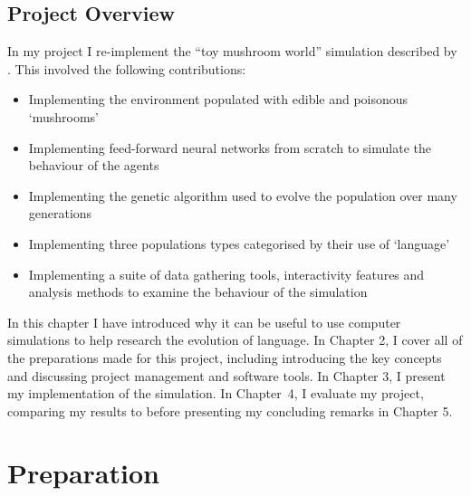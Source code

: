\documentclass[12pt,a4paper,twoside,openright]{report}
\begin{document}
\section{Project Overview}

\enlargethispage*{1cm}

In my project I re-implement the ``toy mushroom world'' simulation described by \citet{Cangelosi1998}. This involved the following contributions:
\begin{itemize}
	\itemsep0em
	\item Implementing the environment populated with edible and poisonous `mushrooms'
	\item Implementing feed-forward neural networks from scratch to simulate the behaviour of the agents
	\item Implementing the genetic algorithm used to evolve the population over many generations
	\item Implementing three populations types categorised by their use of `language'
	\item Implementing a suite of data gathering tools, interactivity features and analysis methods to examine the behaviour of the simulation
\end{itemize}

In this chapter I have introduced why it can be useful to use computer simulations to help research the evolution of language. In Chapter 2, I cover all of the preparations made for this project, including introducing the key concepts and discussing project management and software tools. In Chapter 3, I present my implementation of the simulation. In Chapter~4, I evaluate my project, comparing my results to \citet{Cangelosi1998} before presenting my concluding remarks in Chapter 5. 


\chapter{Preparation}\label{chapter:preparation}
\end{document}
